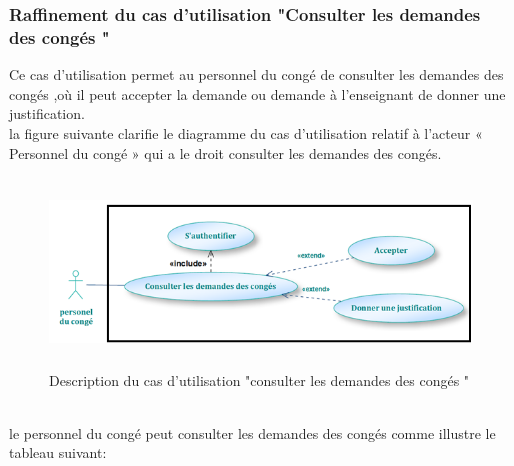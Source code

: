 \documentclass[12 pt ]{report}
\begin{document}
\subsubsection{Raffinement du cas d'utilisation "Consulter les demandes des congés "}
Ce cas d'utilisation permet au personnel du congé de consulter les demandes des congés ,où  il peut accepter la demande ou demande à l'enseignant de donner une justification.\\
la figure suivante clarifie le diagramme du cas d’utilisation  relatif à l’acteur « Personnel du congé » qui a le droit consulter les demandes des congés.
\begin{figure}[h]
\begin{center}
\includegraphics[width= 13cm , height =5cm]{cas_gererconge.PNG}
\caption{Description du cas d'utilisation "consulter les demandes des congés "}
\end{center}
\end{figure}\\
le personnel du congé peut consulter les demandes des congés comme illustre le tableau suivant:
\end{document}

